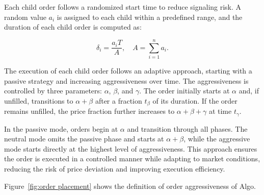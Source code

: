 Each child order follows a randomized start time to reduce signaling risk. A random value $a_i$ is assigned to each child within a predefined range, and the duration of each child order is computed as:

\begin{equation}
    \delta_i = \frac{a_i T}{A}, \quad A = \sum_{i=1}^{n} a_i.
    \label{eq:sigma and A}
\end{equation}

The execution of each child order follows an adaptive approach, starting with a passive strategy and increasing aggressiveness over time. The aggressiveness is controlled by three parameters: $\alpha$, $\beta$, and $\gamma$. The order initially starts at $\alpha$ and, if unfilled, transitions to $\alpha + \beta$ after a fraction $t_{\beta}$ of its duration. If the order remains unfilled, the price fraction further increases to $\alpha + \beta + \gamma$ at time $t_{\gamma}$.



In the passive mode, orders begin at $\alpha$ and transition through all phases. The neutral mode omits the passive phase and starts at $\alpha + \beta$, while the aggressive mode starts directly at the highest level of aggressiveness. This approach ensures the order is executed in a controlled manner while adapting to market conditions, reducing the risk of price deviation and improving execution efficiency.

Figure~\ref{fig:order placement} shows the definition of order aggressiveness of Algo.

